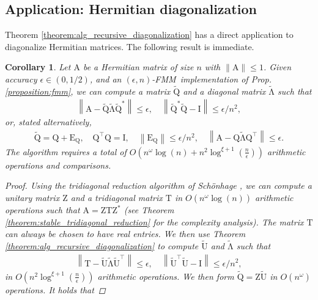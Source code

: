 \documentclass{article}
\newcommand{\lnorm}{\left\|}
\newcommand{\rnorm}{\right\|}
\newcommand{\lpar}{\left(}
\newcommand{\rpar}{\right)}
\newtheorem{corollary}{Corollary}[section]
\newcommand\matA{\boldsymbol{\mathrm{A}}}
\newcommand\matE{\boldsymbol{\mathrm{E}}}
\newcommand\matI{\boldsymbol{\mathrm{I}}}
\newcommand\matQ{\boldsymbol{\mathrm{Q}}}
\newcommand\matT{\boldsymbol{\mathrm{T}}}
\newcommand\matZ{\boldsymbol{\mathrm{Z}}}
\newcommand\matQtilde{\widetilde{\boldsymbol{\mathrm{Q}}}}
\newcommand\matUtilde{\widetilde{\boldsymbol{\mathrm{U}}}}
\newcommand\matLambdatilde{\widetilde{\boldsymbol{\mathrm{\Lambda}}}}
\newcommand{\cfmm}{\xi}
\newcommand{\fmmalgo}{FMM} \usepackage[utf8]{inputenc}
\begin{document}
\subsection{Application: Hermitian diagonalization}
\label{appendix:hermitian_diagonalization_analysis}
Theorem \ref{theorem:alg_recursive_diagonalization} has a direct application to diagonalize Hermitian matrices. The following result is immediate.
\begin{corollary}
    \label{corollary:hermitian_diagonalization_appendix}
    Let $\matA$ be a Hermitian matrix of size $n$ with $\|\matA\|\leq 1$. Given accuracy $\epsilon\in(0,1/2)$, and an $(\epsilon,n)$-\fmmalgo\   implementation of Prop. \ref{proposition:fmm}, we can compute a matrix $\matQtilde$ and a diagonal matrix $\matLambdatilde$ such that
    \begin{align*}
        \lnorm \matA - \matQtilde\matLambdatilde\matQtilde^* \rnorm \leq \epsilon,
        \quad
        \lnorm \matQtilde^* \matQtilde - \matI \rnorm \leq \epsilon/n^2,
    \end{align*}
    or, stated alternatively,
    \begin{align*}
        \matQtilde=\matQ+\matE_{\matQ},
        \quad
        \matQ^\top\matQ=\matI,
        \quad
        \lnorm \matE_{\matQ} \rnorm \leq \epsilon/n^2,
        \quad
        \lnorm \matA - \matQ\matLambdatilde\matQ^\top \rnorm \leq \epsilon.
    \end{align*}
    The algorithm requires a total of $O\lpar n^\omega\log(n) + n^2\log^{\cfmm+1}(\tfrac{n}{\epsilon})\rpar$ arithmetic operations and comparisons.
    \begin{proof}
        Using the tridiagonal reduction algorithm of Schönhage \cite{schonhage1972unitare}, we can compute a unitary matrix $\matZ$ and a tridiagonal matrix $\matT$ in $O(n^\omega\log(n))$ arithmetic operations such that $\matA=\matZ\matT\matZ^*$ (see Theorem \ref{theorem:stable_tridiagonal_reduction} for the complexity analysis). The matrix $\matT$ can always be chosen to have real entries. We then use Theorem \ref{theorem:alg_recursive_diagonalization} to compute $\matUtilde$ and $\matLambdatilde$ such that \begin{align*}
            \lnorm \matT - \matUtilde\matLambdatilde\matUtilde^\top \rnorm \leq \epsilon,
            \quad
            \lnorm \matUtilde^\top \matUtilde - \matI \rnorm \leq \epsilon/n^2,
        \end{align*}
        in $O\lpar n^2\log^{\cfmm+1}(\tfrac{n}{\epsilon})\rpar$ arithmetic operations.
        We then form $\matQtilde=\matZ\matUtilde$ in $O(n^\omega)$ operations. It holds that

\end{proof}
\end{corollary}
\end{document}
